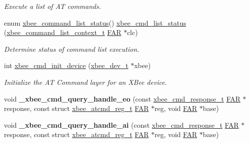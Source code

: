 \begin{DoxyCompactItemize}
\begin{DoxyCompactList}\small\item\em Execute a list of AT commands. \end{DoxyCompactList}\item 
enum \hyperlink{group__xbee__atcmd_ga3ec63530d743d1c91126c67493c3245d}{xbee\+\_\+command\+\_\+list\+\_\+status}() \hyperlink{group__xbee__atcmd_gafb2d1636c675066469ee388170ea27a0}{xbee\+\_\+cmd\+\_\+list\+\_\+status} (\hyperlink{structxbee__command__list__context__t}{xbee\+\_\+command\+\_\+list\+\_\+context\+\_\+t} \hyperlink{group__hal_gaef060b3456fdcc093a7210a762d5f2ed}{F\+AR} $\ast$clc)
\begin{DoxyCompactList}\small\item\em Determine status of command list execution. \end{DoxyCompactList}\item 
int \hyperlink{group__xbee__atcmd_ga1cc803f821ed44e27e404d38349f53c7}{xbee\+\_\+cmd\+\_\+init\+\_\+device} (\hyperlink{structxbee__dev__t}{xbee\+\_\+dev\+\_\+t} $\ast$xbee)
\begin{DoxyCompactList}\small\item\em Initialize the AT Command layer for an X\+Bee device. \end{DoxyCompactList}\item 
\mbox{\label{group__xbee__atcmd_gac58af8f94f76f3d3201c055aaa9a559b}} 
void {\bfseries \+\_\+xbee\+\_\+cmd\+\_\+query\+\_\+handle\+\_\+eo} (const \hyperlink{structxbee__cmd__response__t}{xbee\+\_\+cmd\+\_\+response\+\_\+t} \hyperlink{group__hal_gaef060b3456fdcc093a7210a762d5f2ed}{F\+AR} $\ast$response, const struct \hyperlink{structxbee__atcmd__reg__t}{xbee\+\_\+atcmd\+\_\+reg\+\_\+t} \hyperlink{group__hal_gaef060b3456fdcc093a7210a762d5f2ed}{F\+AR} $\ast$reg, void \hyperlink{group__hal_gaef060b3456fdcc093a7210a762d5f2ed}{F\+AR} $\ast$base)
\item 
\mbox{\label{group__xbee__atcmd_ga1a1bd382a9a9f19787577bd709679f82}} 
void {\bfseries \+\_\+xbee\+\_\+cmd\+\_\+query\+\_\+handle\+\_\+ai} (const \hyperlink{structxbee__cmd__response__t}{xbee\+\_\+cmd\+\_\+response\+\_\+t} \hyperlink{group__hal_gaef060b3456fdcc093a7210a762d5f2ed}{F\+AR} $\ast$response, const struct \hyperlink{structxbee__atcmd__reg__t}{xbee\+\_\+atcmd\+\_\+reg\+\_\+t} \hyperlink{group__hal_gaef060b3456fdcc093a7210a762d5f2ed}{F\+AR} $\ast$reg, void \hyperlink{group__hal_gaef060b3456fdcc093a7210a762d5f2ed}{F\+AR} $\ast$base)

\end{DoxyCompactItemize}

